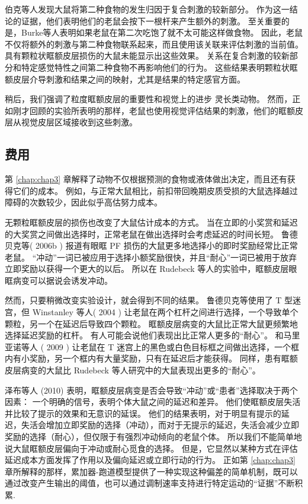 伯克等人发现大鼠将第二种食物的发生归因于复合刺激的较新部分。
作为这一结论的证据，他们表明他们的老鼠会按下一根杆来产生额外的刺激。
至关重要的是，Burke等人表明如果老鼠在第二次吃饱了就不太可能这样做食物。
因此，老鼠不仅将额外的刺激与第二种食物联系起来，而且使用该关联来评估刺激的当前值。
具有颗粒状眶额皮层损伤的大鼠未能显示出这些效果。
关系在复合刺激的较新部分和特定感觉特性之间第二种食物不再影响他们的行为。
这些结果表明颗粒状眶额皮层介导刺激和结果之间的映射，尤其是结果的特定感官方面。\par


稍后，我们强调了粒度眶额皮层的重要性和视觉上的进步
灵长类动物。
然而，正如刚才回顾的实验所表明的那样，老鼠也使用视觉评估结果的刺激，他们的眶额皮层从视觉皮层区域接收到这些刺激。\par



\subsection{费用}

第 \ref{chap:chap3} 章解释了动物不仅根据预测的食物或液体做出决定，而且还有获得它们的成本。
例如，与正常大鼠相比，前扣带回晚期皮质受损的大鼠选择越过障碍的次数较少，因此似乎高估努力成本。\par


无颗粒眶额皮层的损伤也改变了大鼠估计成本的方式。
当在立即的小奖赏和延迟的大奖赏之间做出选择时，正常老鼠在做出选择时会考虑延迟的时间长短。
鲁德贝克等( 2006b ) 报道有眼眶 PF 损伤的大鼠更多地选择小的即时奖励经常比正常老鼠。
“冲动”一词已被应用于选择小额奖励很快，并且“耐心”一词已被用于放弃立即奖励以获得一个更大的以后。
所以在 Rudebeck 等人的实验中，眶额皮层眼眶病变可以据说会诱发冲动。\par


然而，只要稍微改变实验设计，就会得到不同的结果。
鲁德贝克等使用了 T 型迷宫，但 Winstanley 等人( 2004 ) 让老鼠在两个杠杆之间进行选择，一个导致单个颗粒，另一个在延迟后导致四个颗粒。 
眶额皮层病变的大鼠比正常大鼠更频繁地选择延迟奖励的杠杆。
有人可能会说他们表现出比正常人更多的“耐心”。
和马里亚诺等人 ( 2009 ) 让老鼠在 T 迷宫上的黑色或白色目标框之间做出选择，一个框内有小奖励，另一个框内有大量奖励，只有在延迟后才能获得。
同样，患有眶额皮层病变的大鼠比 Rudebeck 等人研究中的大鼠表现出更多的“耐心”。\par


泽布等人 (2010) 表明，眶额皮层病变是否会导致“冲动”或“患者”选择取决于两个因素：
一个明确的信号，表明个体大鼠之间的延迟和差异。
他们使眶额皮层失活并比较了提示的效果和无意识的延误。
他们的结果表明，对于明显有提示的延迟，失活会增加立即奖励的选择（冲动），而对于无提示的延迟，失活会减少立即奖励的选择（耐心），但仅限于有强烈冲动倾向的老鼠个体。
所以我们不能简单地说大鼠眶额皮层偏向于冲动或耐心觅食的选择。
但是，它显然以某种方式在评估延迟成本方面发挥了作用以及偏向延迟或立即行动的行为。
正如第 \ref{chap:chap3} 章所解释的那样，累加器-跑道模型提供了一种实现这种偏差的简单机制，既可以通过改变产生输出的阈值，也可以通过调制速率支持进行特定运动的“证据”不断积累. \par


